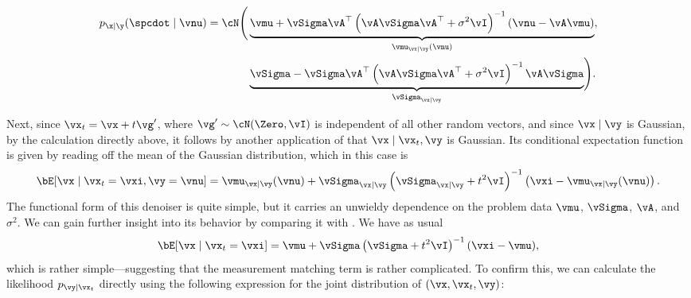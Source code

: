 \documentclass[../../book-main.tex]{subfiles}
\begin{document}
\begin{example}
    \begin{equation}
        \begin{split}
            p_{\x \mid \y}(\spcdot \mid \vnu) = \cN\Biggl(
                &\underbrace{%
                    \vmu + \vSigma\vA^\top \left(\vA\vSigma\vA^\top +
                    \sigma^2 \vI\right)^{-1}
                (\vnu - \vA\vmu)}_{\vmu_{\vx \mid \vy}(\vnu)}, \\
                &\underbrace{%
                    \vSigma - \vSigma \vA^\top
                    \left(\vA\vSigma\vA^\top + \sigma^2
                \vI\right)^{-1} \vA \vSigma}_{\vSigma_{\vx\mid \vy}}
            \Biggr).
        \end{split}
    \end{equation}

    Next, since $\vx_t = \vx + t \vg'$, where $\vg' \sim \cN(\Zero, \vI)$ is
    independent of all other random vectors, and since $\vx \mid \vy$
    is Gaussian,
    by the calculation directly above, it follows by another
    application of  that $\vx
    \mid \vx_t, \vy$
    is Gaussian. Its conditional expectation function is given by
    reading off the
    mean of the Gaussian distribution, which in this case is
    \begin{equation}\label{eq:conditional-posterior-denoiser-gaussian-case}
        \bE[ \vx \mid \vx_t=\vxi, \vy=\vnu ]
        =
        \vmu_{\vx\mid \vy}(\vnu) + \vSigma_{\vx\mid\vy}\left(
            \vSigma_{\vx\mid \vy} + t^2 \vI
        \right)^{-1}\left(
            \vxi - \vmu_{\vx\mid \vy}(\vnu)
        \right).
    \end{equation}
    The functional form of this denoiser is quite simple, but it carries an
    unwieldy dependence on the problem data $\vmu$, $\vSigma$, $\vA$, and
    $\sigma^2$.
    We can gain further insight into its behavior by comparing it with
    .
    We have as usual
    \begin{equation}\label{eq:posterior-denoiser-gaussian-case}
        \bE[\vx \mid \vx_t=\vxi]
        = \vmu + \vSigma\left(\vSigma + t^2 \vI\right)^{-1} (\vxi - \vmu),
    \end{equation}
    which is rather simple---suggesting that the measurement matching term is
    rather complicated. To confirm this, we can calculate the likelihood $p_{\vy
    \mid \vx_t}$ directly using the following expression for the joint
    distribution of $(\vx, \vx_t, \vy)$:
    \begin{equation}

\end{equation}
\end{example}
\end{document}
